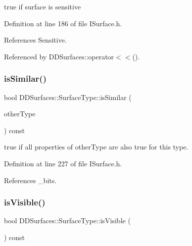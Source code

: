 true if surface is sensitive 



Definition at line 186 of file I\+Surface.\+h.



References Sensitive.



Referenced by D\+D\+Surfaces\+::operator$<$$<$().

\hypertarget{class_d_d_surfaces_1_1_surface_type_aa4ac4b76c8fe761059f536e32ca58eaf}{}\label{class_d_d_surfaces_1_1_surface_type_aa4ac4b76c8fe761059f536e32ca58eaf} 
\subsubsection{\texorpdfstring{is\+Similar()}{isSimilar()}}
{\footnotesize\ttfamily bool D\+D\+Surfaces\+::\+Surface\+Type\+::is\+Similar (\begin{DoxyParamCaption}\item[{const \hyperlink{class_d_d_surfaces_1_1_surface_type}{Surface\+Type} \&}]{other\+Type }\end{DoxyParamCaption}) const\hspace{0.3cm}{\ttfamily [inline]}}



true if all properties of other\+Type are also true for this type. 



Definition at line 227 of file I\+Surface.\+h.



References \+\_\+bits.

\hypertarget{class_d_d_surfaces_1_1_surface_type_abcf9f499556546f6717f706a05afee96}{}\label{class_d_d_surfaces_1_1_surface_type_abcf9f499556546f6717f706a05afee96} 
\subsubsection{\texorpdfstring{is\+Visible()}{isVisible()}}
{\footnotesize\ttfamily bool D\+D\+Surfaces\+::\+Surface\+Type\+::is\+Visible (\begin{DoxyParamCaption}{ }\end{DoxyParamCaption}) const\hspace{0.3cm}{\ttfamily [inline]}}



